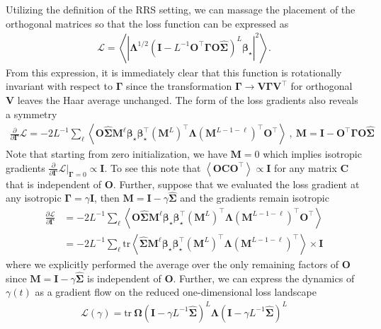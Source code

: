 \documentclass{article} %
\begin{document}
Utilizing the definition of the RRS setting, we can massage the placement of the orthogonal matrices so that the loss function can be expressed as 
\begin{align}
    \mathcal L = \left< |\bm\Lambda^{1/2} \left( \bm I - L^{-1} \bm O^\top \bm \Gamma \bm O \hat{\bm\Sigma}  \right)^L  \bm\beta_\star |^2 \right> .
\end{align}
From this expression, it is immediately clear that this function is rotationally invariant with respect to $\bm\Gamma$ since the transformation $\bm\Gamma \to \bm V \bm \Gamma \bm V^\top$ for orthogonal $\bm V$ leaves the Haar average unchanged. The form of the loss gradients also reveals a symmetry 
\begin{align}
    \frac{\partial}{\partial \bm\Gamma} \mathcal L =  - 2 L^{-1}  \sum_{\ell} \left<  \bm O  \hat{\bm\Sigma} \bm M^{\ell} \bm\beta_\star \bm\beta_\star^\top \left(\bm M^L \right)^\top \bm\Lambda \left( \bm M^{L-1-\ell} \right)^\top \bm O^\top \right>  \ , \ \bm M = \bm I - \bm O^\top \bm \Gamma \bm O \hat{\bm\Sigma}
\end{align}
Note that starting from zero initialization, we have $\bm M = 0$ which implies isotropic gradients $\frac{\partial}{\partial \bm\Gamma} \mathcal L|_{\bm\Gamma=0} \propto \bm I$. To see this note that $\left<  \bm O \bm C \bm O^\top \right> \propto \bm I$ for any matrix $\bm C$ that is independent of $\bm O$. Further, suppose that we evaluated the loss gradient at any isotropic $\bm\Gamma = \gamma \bm I$, then $\bm M = \bm I - \gamma \hat{\bm\Sigma}$ and the gradients remain isotropic
\begin{align}
    \frac{\partial \mathcal L}{\partial \bm\Gamma} &=  - 2 L^{-1}  \sum_{\ell} \left<  \bm O  \hat{\bm\Sigma} \bm M^{\ell} \bm\beta_\star \bm\beta_\star^\top \left(\bm M^L \right)^\top \bm\Lambda \left( \bm M^{L-1-\ell} \right)^\top \bm O^\top \right> 
    \\
    &=  - 2 L^{-1}  \sum_{\ell} \text{tr} \left<    \hat{\bm\Sigma} \bm M^{\ell} \bm\beta_\star \bm\beta_\star^\top \left(\bm M^L \right)^\top \bm\Lambda \left( \bm M^{L-1-\ell} \right)^\top \right>  \times \bm I
\end{align}
where we explicitly performed the average over the only remaining factors of $\bm O$ since $\bm M = \bm I - \gamma \hat{\bm\Sigma}$ is independent of $\bm O$. Further, we can express the dynamics of $\gamma(t)$ as a gradient flow on the reduced one-dimensional loss landscape
\begin{align}
    \mathcal L(\gamma) = \text{tr} \ \bm\Omega \left( \bm I - \gamma L^{-1} \hat{\bm\Sigma} \right)^L \bm\Lambda \left( \bm I - \gamma L^{-1} \hat{\bm\Sigma} \right)^L 
\end{align}
\end{document}
